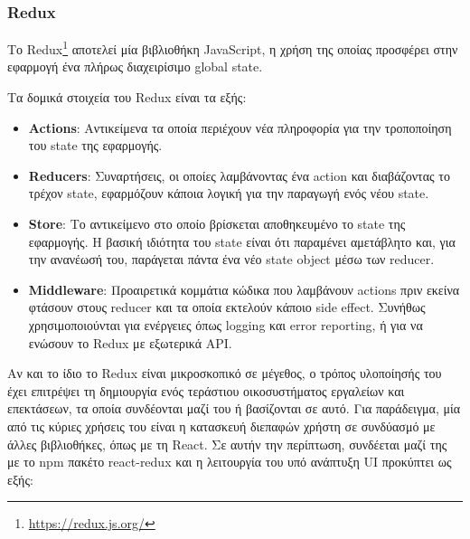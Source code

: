 \subsubsection{Redux} \label{subsection:4-2-2-2-redux}


Το Redux\footnote{\url{https://redux.js.org/}} αποτελεί μία βιβλιοθήκη JavaScript, η χρήση της οποίας προσφέρει στην εφαρμογή ένα πλήρως διαχειρίσιμο global state.

Τα δομικά στοιχεία του Redux είναι τα εξής:
\begin{itemize}
	\item \textbf{Actions}: Αντικείμενα τα οποία περιέχουν νέα πληροφορία για την τροποποίηση του state της εφαρμογής.
	\item \textbf{Reducers}: Συναρτήσεις, οι οποίες λαμβάνοντας ένα action και διαβάζοντας το τρέχον state, εφαρμόζουν κάποια λογική για την παραγωγή ενός νέου state.
	\item \textbf{Store}: Το αντικείμενο στο οποίο βρίσκεται αποθηκευμένο το state της εφαρμογής. Η βασική ιδιότητα του state είναι ότι παραμένει αμετάβλητο και, για την ανανέωσή του, παράγεται πάντα ένα νέο state object μέσω των reducer.
	\item \textbf{Middleware}: Προαιρετικά κομμάτια κώδικα που λαμβάνουν actions πριν εκείνα φτάσουν στους reducer και τα οποία εκτελούν κάποιο side effect. Συνήθως χρησιμοποιούνται για ενέργειες όπως logging και error reporting, ή για να ενώσουν το Redux με εξωτερικά API. 
\end{itemize}

Αν και το ίδιο το Redux είναι μικροσκοπικό σε μέγεθος, ο τρόπος υλοποίησής του έχει επιτρέψει τη δημιουργία ενός τεράστιου οικοσυστήματος εργαλείων και επεκτάσεων, τα οποία συνδέονται μαζί του ή βασίζονται σε αυτό. Για παράδειγμα, μία από τις κύριες χρήσεις του είναι η κατασκευή διεπαφών χρήστη σε συνδύασμό με άλλες βιβλιοθήκες, όπως με τη React. Σε αυτήν την περίπτωση, συνδέεται μαζί της με το npm πακέτο react-redux και η λειτουργία του υπό ανάπτυξη UI προκύπτει ως εξής:

